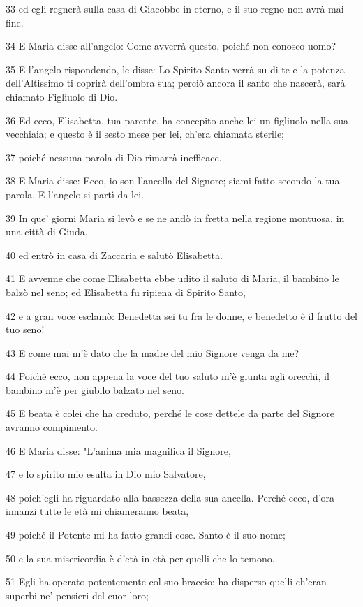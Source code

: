 \par 33 ed egli regnerà sulla casa di Giacobbe in eterno, e il suo regno non avrà mai fine.
\par 34 E Maria disse all'angelo: Come avverrà questo, poiché non conosco uomo?
\par 35 E l'angelo rispondendo, le disse: Lo Spirito Santo verrà su di te e la potenza dell'Altissimo ti coprirà dell'ombra sua; perciò ancora il santo che nascerà, sarà chiamato Figliuolo di Dio.
\par 36 Ed ecco, Elisabetta, tua parente, ha concepito anche lei un figliuolo nella sua vecchiaia; e questo è il sesto mese per lei, ch'era chiamata sterile;
\par 37 poiché nessuna parola di Dio rimarrà inefficace.
\par 38 E Maria disse: Ecco, io son l'ancella del Signore; siami fatto secondo la tua parola. E l'angelo si partì da lei.
\par 39 In que' giorni Maria si levò e se ne andò in fretta nella regione montuosa, in una città di Giuda,
\par 40 ed entrò in casa di Zaccaria e salutò Elisabetta.
\par 41 E avvenne che come Elisabetta ebbe udito il saluto di Maria, il bambino le balzò nel seno; ed Elisabetta fu ripiena di Spirito Santo,
\par 42 e a gran voce esclamò: Benedetta sei tu fra le donne, e benedetto è il frutto del tuo seno!
\par 43 E come mai m'è dato che la madre del mio Signore venga da me?
\par 44 Poiché ecco, non appena la voce del tuo saluto m'è giunta agli orecchi, il bambino m'è per giubilo balzato nel seno.
\par 45 E beata è colei che ha creduto, perché le cose dettele da parte del Signore avranno compimento.
\par 46 E Maria disse: "L'anima mia magnifica il Signore,
\par 47 e lo spirito mio esulta in Dio mio Salvatore,
\par 48 poich'egli ha riguardato alla bassezza della sua ancella. Perché ecco, d'ora innanzi tutte le età mi chiameranno beata,
\par 49 poiché il Potente mi ha fatto grandi cose. Santo è il suo nome;
\par 50 e la sua misericordia è d'età in età per quelli che lo temono.
\par 51 Egli ha operato potentemente col suo braccio; ha disperso quelli ch'eran superbi ne' pensieri del cuor loro;
